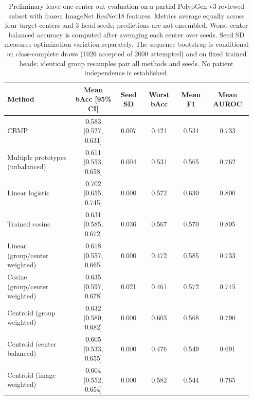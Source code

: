 \begin{table}[t]
\centering
\small
\begin{tabular}{lccccc}
\hline
Method & Mean bAcc [95\% CI] & Seed SD & Worst bAcc & Mean F1 & Mean AUROC \\
\hline
CBMP & 0.583 [0.527, 0.631] & 0.007 & 0.421 & 0.534 & 0.733 \\
Multiple prototypes (unbalanced) & 0.611 [0.553, 0.658] & 0.004 & 0.531 & 0.565 & 0.762 \\
Linear logistic & 0.702 [0.655, 0.745] & 0.000 & 0.572 & 0.630 & 0.800 \\
Trained cosine & 0.631 [0.585, 0.672] & 0.036 & 0.567 & 0.570 & 0.805 \\
Linear (group/center weighted) & 0.618 [0.557, 0.665] & 0.000 & 0.472 & 0.585 & 0.733 \\
Cosine (group/center weighted) & 0.635 [0.597, 0.678] & 0.021 & 0.461 & 0.572 & 0.745 \\
Centroid (group weighted) & 0.632 [0.580, 0.682] & 0.000 & 0.603 & 0.568 & 0.790 \\
Centroid (center balanced) & 0.605 [0.533, 0.655] & 0.000 & 0.476 & 0.549 & 0.691 \\
Centroid (image weighted) & 0.604 [0.552, 0.654] & 0.000 & 0.582 & 0.544 & 0.765 \\
\hline
\end{tabular}
\caption{Preliminary leave-one-center-out evaluation on a partial PolypGen v3 reviewed subset with frozen ImageNet ResNet18 features. Metrics average equally across four target centers and 3 head seeds; predictions are not ensembled. Worst-center balanced accuracy is computed after averaging each center over seeds. Seed SD measures optimization variation separately. The sequence bootstrap is conditional on class-complete draws (1026 accepted of 2000 attempted) and on fixed trained heads; identical group resamples pair all methods and seeds. No patient independence is established.}
\label{tab:polypgen_reviewed_subset}
\end{table}
